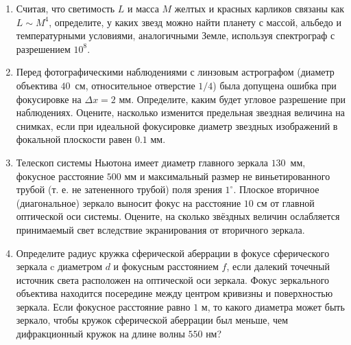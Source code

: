 \documentclass[12pt]{article}
\begin{document}
\begin{enumerate}
    \item Считая, что светимость $L$ и масса $M$ желтых и красных карликов связаны как $L\sim M^4$, определите, у каких звезд можно найти планету с массой, альбедо и температурными условиями, аналогичными Земле, используя спектрограф с разрешением $10^8$.
    \item Перед фотографическими наблюдениями с линзовым астрографом (диаметр объектива $40$~см, относительное отверстие $1/4$) была допущена ошибка при фокусировке на $\Delta x=2$ мм. Определите, каким будет угловое разрешение при наблюдениях. Оцените, насколько изменится предельная звездная величина на снимках, если при идеальной фокусировке диаметр звездных изображений в фокальной плоскости равен $0.1$ мм.
    \item Телескоп системы Ньютона имеет диаметр главного зеркала $130$~мм, фокусное расстояние $500$ мм и максимальный размер не виньетированного трубой (т. е. не затененного трубой) поля зрения $1^{\circ}$. Плоское вторичное (диагональное) зеркало выносит фокус на расстояние $10$ см от главной оптической оси системы. Оцените, на сколько звёздных величин ослабляется принимаемый свет вследствие экранирования от вторичного зеркала.
    \item Определите радиус кружка сферической аберрации в фокусе сферического зеркала c диаметром $d$ и фокусным расстоянием $f$, если далекий точечный источник света расположен на оптической оси зеркала. Фокус зеркального объектива находится посередине между центром кривизны и поверхностью зеркала. Если фокусное расстояние равно $1$ м, то какого диаметра может быть зеркало, чтобы кружок сферической аберрации был меньше, чем дифракционный кружок на длине волны $550$ нм? 
\end{enumerate}
\end{document}
